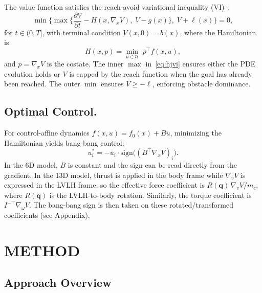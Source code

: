 \documentclass[letterpaper, 10 pt, conference]{ieeeconf}
\begin{document}
The value function satisfies the reach-avoid variational inequality (VI)~\cite{fisac2015, margellos2011}:
\begin{equation}\label{eq:hjvi}
\min\!\Big\{\max\!\Big\{\frac{\partial V}{\partial t} - H(x, \nabla_x V),\; V - g(x)\Big\},\; V + \ell(x)\Big\} = 0,
\end{equation}
for $t \in (0, T]$, with terminal condition $V(x, 0) = b(x)$, where the Hamiltonian is
\begin{equation}\label{eq:hamiltonian}
H(x, p) = \min_{u \in \mathcal{U}} \; p^\top f(x, u),
\end{equation}
and $p = \nabla_x V$ is the costate. The inner $\max$ in~\eqref{eq:hjvi} ensures either the PDE evolution holds or $V$ is capped by the reach function when the goal has already been reached. The outer $\min$ ensures $V \geq -\ell$, enforcing obstacle dominance.

\subsection{Optimal Control.}
For control-affine dynamics $f(x, u) = f_0(x) + Bu$, minimizing the Hamiltonian yields bang-bang control:
\begin{equation}\label{eq:bangbang}
u_i^* = -\bar{u}_i \cdot \mathrm{sign}\!\big((B^\top \nabla_x V)_i\big).
\end{equation}
In the 6D model, $B$ is constant and the sign can be read directly from the gradient. In the 13D model, thrust is applied in the body frame while $\nabla_v V$ is expressed in the LVLH frame, so the effective force coefficient is $R(\mathbf{q})\,\nabla_v V / m_c$, where $R(\mathbf{q})$ is the LVLH-to-body rotation. Similarly, the torque coefficient is $I^{-\top}\nabla_\omega V$. The bang-bang sign is then taken on these rotated/transformed coefficients (see Appendix).

\section{METHOD}

\subsection{Approach Overview}
\end{document}
